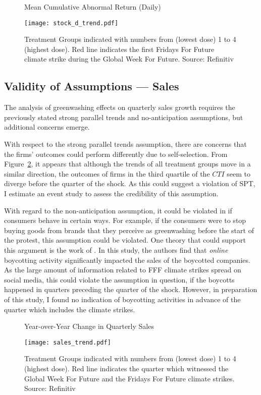 \documentclass[12pt]{article}
\begin{document}
\begin{figure}[t]
    \caption{Mean Cumulative Abnormal Return (Daily)}\label{fig:stock_trend}
    \centering
    \texttt{[image: stock\_d\_trend.pdf]}
    \captionsetup{font=footnotesize}
    \caption*{Treatment Groups indicated with numbers from (lowest dose) 1 to 4 (highest dose). Red line indicates the first Fridays For Future climate strike during the Global Week For Future. Source: Refinitiv}
\end{figure}

\subsection{Validity of Assumptions --- Sales}

The analysis of greenwashing effects on quarterly sales growth requires the previously stated strong parallel trends and no-anticipation assumptions, but additional concerns emerge.

With respect to the strong parallel trends assumption, there are concerns that the firms' outcomes could perform differently due to self-selection. From Figure~\ref{fig:sales_trend}, it appears that although the trends of all treatment groups move in a similar direction, the outcomes of firms in the third quartile of the $CTI$ seem to diverge before the quarter of the shock. As this could suggest a violation of SPT, I estimate an event study to assess the credibility of this assumption.

With regard to the non-anticipation assumption, it could be violated in if consumers behave in certain ways. For example, if the consumers were to stop buying goods from brands that they perceive as greenwashing before the start of the protest, this assumption could be violated. One theory that could support this argument is the work of \textcite{liaukonyteFrontiersSpillingBeans2023}. In this study, the authors find that \textit{online} boycotting activity significantly impacted the sales of the boycotted companies. As the large amount of information related to FFF climate strikes spread on social media, this could violate the assumption in question, if the boycotts happened in quarters preceding the quarter of the shock. However, in preparation of this study, I found no indication of boycotting activities in advance of the quarter which includes the climate strikes. 


\begin{figure}[t]
    \caption{Year-over-Year Change in Quarterly Sales}\label{fig:sales_trend}
    \centering
    \texttt{[image: sales\_trend.pdf]}
    \captionsetup{font=footnotesize}
    \caption*{Treatment Groups indicated with numbers from (lowest dose) 1 to 4 (highest dose). Red line indicates the quarter which witnessed the Global Week For Future and the Fridays For Future climate strikes. Source: Refinitiv}
\end{figure}
\end{document}
